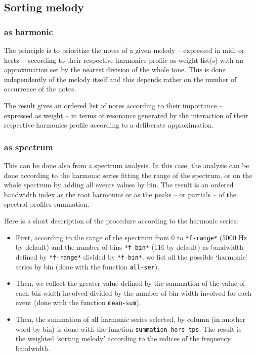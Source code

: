 \subsection{Sorting melody}

\subsubsection{as harmonic}

The principle is to prioritize the notes of a given melody -- expressed in midi or hertz -- according to their respective harmonics profile as weight list(s) with an approximation set by the nearest division of the whole tone. This is done independently of the melody itself and this depends rather on the number of occurrence of the notes.

The result gives an ordered list of notes according to their importance -- expressed as weight -- in terms of resonance generated by the interaction of their respective harmonics profile according to a deliberate approximation.

\subsubsection{as spectrum}

This can be done also from a spectrum analysis. In this case, the analysis can be done according to the harmonic series fitting the range of the spectrum, or on the whole spectrum by adding all events values by bin.
The result is an ordered bandwidth index as the root harmonics or as the peaks -- or partials -- of the spectral profiles summation.

Here is a short description of the procedure according to the harmonic series:
\begin{itemize}
  \item First, according to the range of the spectrum from 0 to \texttt{*f-range*} (5000 Hz by default) and the number of bins \texttt{*f-bin*} (116 by default) as bandwidth defined by \texttt{*f-range*} divided by \texttt{*f-bin*}, we list all the possible `harmonic' series by bin (done with the function \texttt{all-ser}).
  \item Then, we collect the greater value defined by the summation of the value of each bin width involved divided by the number of bin width involved for each event (done with the function \texttt{mean-sum}).
  \item Then, the summation of all harmonic series selected, by column (in another word by bin) is done with the function \texttt{summation-hors-tps}. The result is the weighted `sorting melody' according to the indices of the frequency bandwidth.
\end{itemize}

